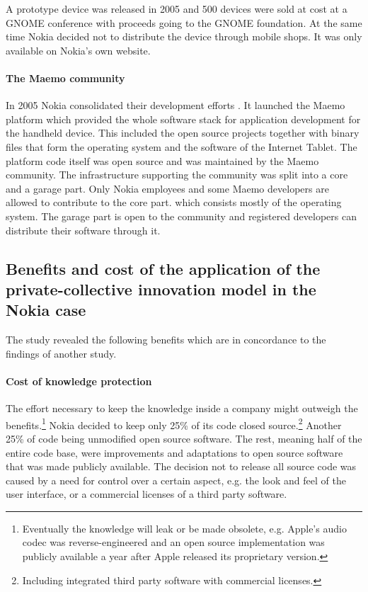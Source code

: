 \documentclass[a4paper]{scrartcl}
\begin{document}
A prototype device was released in 2005 and 500 devices were sold at cost at a GNOME conference with proceeds going to the GNOME foundation.
At the same time Nokia decided not to distribute the device through mobile shops.
It was only available on Nokia's own website.

\paragraph{The Maemo community}
In 2005 Nokia consolidated their development efforts .
It launched the Maemo platform which provided the whole software stack for application development for the handheld device.
This included the open source projects together with binary files that form the operating system and the software of the Internet Tablet.
The platform code itself was open source and was maintained by the Maemo community.
The infrastructure supporting the community was split into a core and a garage part.
Only Nokia employees and some Maemo developers are allowed to contribute to the core part. which consists mostly of the operating system.
The garage part is open to the community and registered developers can distribute their software through it.


\subsection{Benefits and cost of the application of the private-collective innovation model in the Nokia case}

The study revealed the following benefits which are in concordance to the findings of another study\cite{von2009open}.

\paragraph{Cost of knowledge protection}
The effort necessary to keep the knowledge inside a company might outweigh the benefits.\footnote{Eventually the knowledge will leak or be made obsolete, e.g. Apple's audio codec was reverse-engineered and an open source implementation was publicly available a year after Apple released its proprietary version.}
Nokia decided to keep only 25\% of its code closed source.\footnote{Including integrated third party software with commercial licenses.} 
Another 25\% of code being unmodified open source software. 
The rest, meaning half of the entire code base, were improvements and adaptations to open source software that was made publicly available.
The decision not to release all source code was caused by a need for control over a certain aspect, e.g. the look and feel of the user interface, or a commercial licenses of a third party software.
\end{document}
